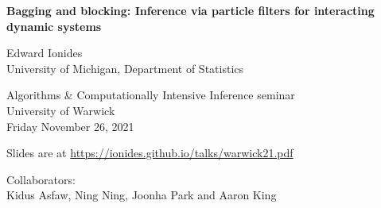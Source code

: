 \documentclass{beamer}
\begin{document}
\begin{frame}
\begin{center}
  {\Large\bf Bagging and blocking: Inference via particle filters for interacting dynamic systems}
  

\vspace{2mm}

Edward Ionides\\
University of Michigan, Department of Statistics

\vspace{8mm}

Algorithms \& Computationally Intensive Inference seminar\\
University of Warwick
\\
Friday November 26, 2021
\\

\hspace{3mm}

Slides are at \url{https://ionides.github.io/talks/warwick21.pdf}

\vspace{8mm}

Collaborators:\\
Kidus Asfaw, Ning Ning, Joonha Park and Aaron King\\

\end{center}

\end{frame}
\end{document}
